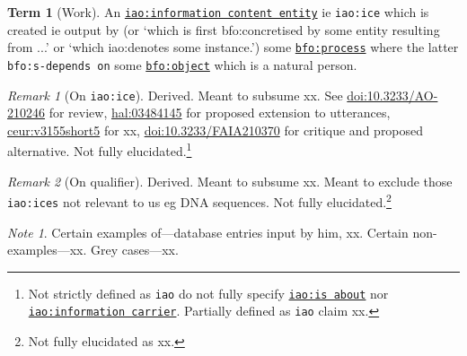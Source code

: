 \documentclass{amsart}%
\newcommand{\code}[1]{\texttt{#1}}%
\theoremstyle{plain}
\theoremstyle{definition}
\theoremstyle{remark}
\newtheorem*{note}{Note}
\theoremstyle{definition}
\newtheorem{term}{Term}[subsection]%
\theoremstyle{remark}
\newtheorem*{term-note}{Remark}
\begin{document}
%
%
%
\begin{term}[Work]
\label{term:work}
An \href{http://purl.obolibrary.org/obo/IAO_0000030}{\code{iao:information content entity}} ie \code{iao:ice} which is created ie output by (or `which is first bfo:concretised by some entity resulting from ...' or `which iao:denotes some instance.') some \href{http://purl.obolibrary.org/obo/BFO_0000015}{\code{bfo:process}} where the latter \code{bfo:s-depends on} some \href{http://purl.obolibrary.org/obo/BFO_0000030}{\code{bfo:object}} which is a natural person.%
\begin{term-note}[On \code{iao:ice}]
Derived. Meant to subsume xx. See \href{https://doi.org/10.3233/AO-210246}{doi:10.3233/AO-210246} for review, \href{https://hal.science/hal-03484145}{hal:03484145} for proposed extension to utterances, \href{https://ceur-ws.org/Vol-3155/short5.pdf}{ceur:v3155short5} for xx, \href{https://doi.org/10.3233/FAIA210370}{doi:10.3233/FAIA210370} for critique and proposed alternative. Not fully elucidated.\footnote{Not strictly defined as \code{iao} do not fully specify \href{http://purl.obolibrary.org/obo/IAO_0000136}{\code{iao:is about}} nor \href{http://purl.obolibrary.org/obo/IAO_0000015}{\code{iao:information carrier}}. %
Partially defined as \code{iao} claim xx.}
\end{term-note}
\begin{term-note}[On qualifier]%
Derived. Meant to subsume xx. Meant to exclude those \code{iao:ices} not relevant to us eg DNA sequences. Not fully elucidated.\footnote{Not fully elucidated as xx.}
\end{term-note}
\begin{note}
Certain examples of---database entries input by him, xx. Certain non-examples---xx. Grey cases---xx.%
\end{note}
\end{term}
%
%
%
\end{document}
